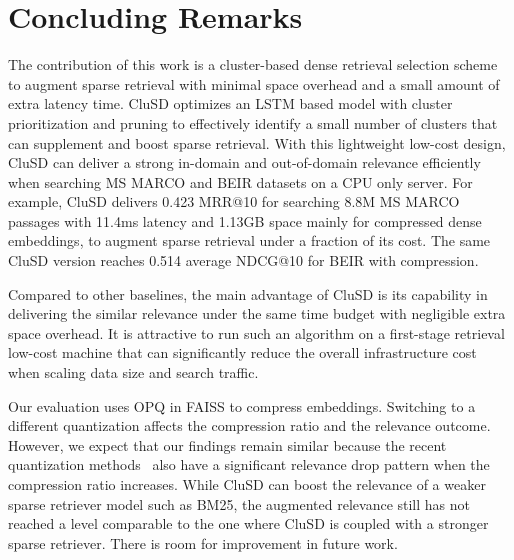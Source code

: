 \section{Concluding Remarks}

The contribution of this work is a cluster-based dense retrieval selection scheme  
to augment sparse retrieval with minimal space overhead and a small amount of extra latency  time.
CluSD optimizes an LSTM based model with cluster prioritization and pruning
to effectively identify  a small number of clusters that can supplement and boost  sparse retrieval. 
With this lightweight low-cost design,  
CluSD can deliver a strong in-domain and out-of-domain relevance  efficiently when searching  MS MARCO and BEIR datasets
on a CPU only server. %
For example, CluSD delivers 0.423 MRR@10  for searching 8.8M MS MARCO passages 
with 11.4ms  latency and  1.13GB space mainly for compressed dense embeddings, to augment sparse retrieval under
a fraction of its  cost. The same  CluSD version  reaches  0.514 average NDCG@10 for BEIR with compression.

Compared to other baselines, the main advantage of CluSD is its capability in delivering the similar 
relevance under the same time budget
with negligible extra space overhead. It is attractive to run such an algorithm on a first-stage retrieval low-cost machine
that can  significantly reduce the overall infrastructure cost when scaling  data size and  search traffic. 


Our evaluation uses OPQ in FAISS to compress embeddings. 
Switching to a different quantization affects the compression ratio and  the relevance outcome.  
However, we expect that our findings remain similar because  the recent  quantization 
methods~\cite{2021CIKM-JPQ-Zhan,  2022WSDM-Zhan-RepCONC, Xiao2022Distill-VQ}
also have  a significant relevance drop pattern when the compression ratio increases.
While  CluSD can  boost the relevance of a weaker sparse retriever model such as BM25, the augmented relevance still has not reached a level
comparable  to the one where CluSD is coupled with a stronger sparse retriever. There is room for improvement in future work.

%
